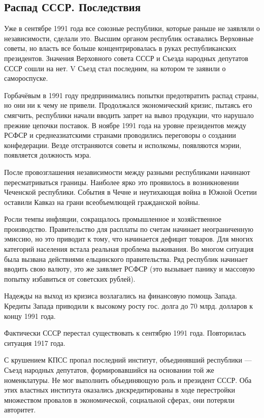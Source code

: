 \subsection{Распад СССР. Последствия}
Уже в сентябре 1991 года все союзные республики, которые раньше не заявляли о независимости, сделали это. Высшим органом республик оставались Верховные советы, но власть все больше концентрировалась в руках республиканских президентов. Значения Верховного совета СССР и Съезда народных депутатов СССР сошли на нет. V Съезд стал последним, на котором те заявили о самороспуске. 

Горбачёвым в 1991 году предпринимались попытки предотвратить распад страны, но они ни к чему не привели. Продолжался экономический кризис, пытаясь его смягчить, республики начали вводить запрет на вывоз продукции, что нарушало прежние цепочки поставок. В ноябре 1991 года на уровне президентов между РСФСР и среднеазиатскими странами проводились переговоры о создании конфедерации.
Везде отстраняются советы и исполкомы, появляются мэрии, появляется должность мэра.

После провозглашения независимости между разными республиками начинают пересматриваться границы. Наиболее ярко это проявилось в возникновении Чеченской республики. События в Чечне и неутихающая война в Южной Осетии оставили Кавказ на грани всеобъемлющей гражданской войны.

Росли темпы инфляции, сокращалось промышленное и хозяйственное производство. Правительство для расплаты по счетам начинает неограниченную эмиссию, но это приводит к тому, что начинается дефицит товаров. Для многих категорий населения встала реальная проблема выживания. Во многом ситуация была вызвана действиями ельцинского правительства. Ряд республик начинает вводить свою валюту, это же заявляет РСФСР (это вызывает панику и массовую попытку избавиться от советских рублей).

Надежды на выход из кризиса возлагались на финансовую помощь Запада. Кредиты Запада приводили к высокому росту гос. долга до 70 млрд. долларов к концу 1991 года.

Фактически СССР перестал существовать к сентябрю 1991 года. Повторилась ситуация 1917 года.

С крушением КПСС пропал последний институт, объединявший республики --- Съезд народных депутатов, формировавшийся на основании той же номенклатуры. Не мог выполнить объединяющую роль и президент СССР. Оба этих властных института оказались дискредитированы в ходе перестройки множеством провалов в экономической, социальной сферах, они потеряли авторитет.

